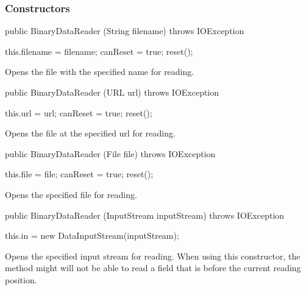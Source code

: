 \subsubsection*{Constructors}

\begin{code}

   public BinaryDataReader (String filename) throws IOException \begin{hide} {
      this.filename = filename;
      canReset = true;
      reset();
   }
   \end{hide}
\end{code}
\begin{tabb}
Opens the file with the specified name for reading.
\end{tabb}
\begin{htmlonly}
\end{htmlonly}
\begin{code}

   public BinaryDataReader (URL url) throws IOException \begin{hide} {
      this.url = url;
      canReset = true;
      reset();
   }
   \end{hide}
\end{code}
\begin{tabb}
Opens the file at the specified url for reading.
\end{tabb}
\begin{htmlonly}
\end{htmlonly}
\begin{code}

   public BinaryDataReader (File file) throws IOException \begin{hide} {
      this.file = file;
      canReset = true;
      reset();
   }
   \end{hide}
\end{code}
\begin{tabb}
Opens the specified file for reading.
\end{tabb}
\begin{htmlonly}
\end{htmlonly}
\begin{code}

   public BinaryDataReader (InputStream inputStream) throws IOException \begin{hide} {
      this.in = new DataInputStream(inputStream);
   }
   \end{hide}
\end{code}
\begin{tabb}
Opens the specified input stream for reading.
When using this constructor, the method  might will not be able to read
a field that is before the current reading position.
\end{tabb}
\begin{htmlonly}
\end{htmlonly}

